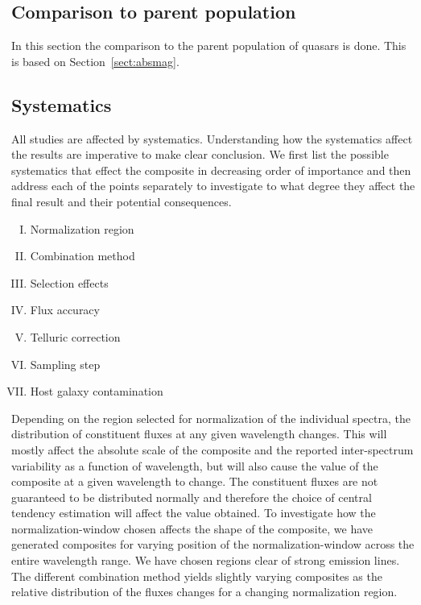 \documentclass{aa}    %
\newcommand{\sectionname}{Section}
\newcommand{\Sect}[1]{\sectionname~\ref{sect:#1}}
\newcommand{\sect}[1]{\Sect{#1}}
\newcommand{\sectlabel}[1]{\label{sect:#1}}
\begin{document}
\subsection{Comparison to parent population}  \sectlabel{parents}
In this section the comparison to the parent population of quasars is done. This is based on \sect{absmag}.



\subsection{Systematics}  \sectlabel{systematics}

All studies are affected by systematics. Understanding how the systematics affect the results are imperative to make clear conclusion. We first list the possible systematics that effect the composite in decreasing order of importance and then address each of the points separately to investigate to what degree they affect the final result and their potential consequences.


\begin{enumerate}[(I)]
	\item Normalization region
	\item Combination method
	\item Selection effects
	\item Flux accuracy
	\item Telluric correction
	\item Sampling step
	\item Host galaxy contamination
\end{enumerate}




Depending on the region selected for normalization of the individual spectra, the distribution of constituent fluxes at any given wavelength changes. This will mostly affect the absolute scale of the composite and the reported inter-spectrum variability as a function of wavelength, but will also cause the value of the composite at a given wavelength to change. The constituent fluxes are not guaranteed to be distributed normally and therefore the choice of central tendency estimation will affect the value obtained. To investigate how the normalization-window chosen affects the shape of the composite, we have generated composites for varying position of the normalization-window across the entire wavelength range. We have chosen regions clear of strong emission lines. The different combination method yields slightly varying composites as the relative distribution of the fluxes changes for a changing normalization region.
\end{document}
